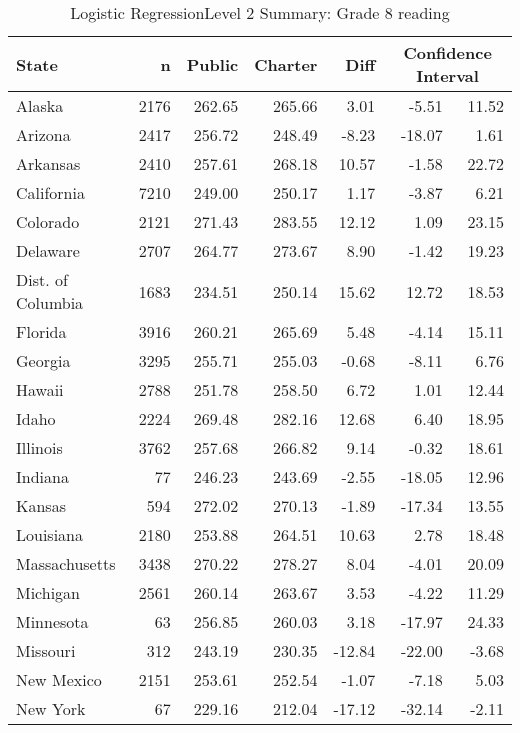 \begin{table}[ht]
\begin{center}
\caption{Logistic RegressionLevel 2 Summary: Grade 8 reading}
\label{g8readinglrlevel2}
\begin{tabular}{lrrrrrr}
  \hline
  State & n & Public & Charter & Diff & \multicolumn{2}{c}{Confidence Interval} \\ \hline
Alaska & 2176 & 262.65 & 265.66 & 3.01 & -5.51 & 11.52 \\ 
  Arizona & 2417 & 256.72 & 248.49 & -8.23 & -18.07 & 1.61 \\ 
  Arkansas & 2410 & 257.61 & 268.18 & 10.57 & -1.58 & 22.72 \\ 
  California & 7210 & 249.00 & 250.17 & 1.17 & -3.87 & 6.21 \\ 
  Colorado & 2121 & 271.43 & 283.55 & 12.12 & 1.09 & 23.15 \\ 
  Delaware & 2707 & 264.77 & 273.67 & 8.90 & -1.42 & 19.23 \\ 
  Dist. of Columbia & 1683 & 234.51 & 250.14 & 15.62 & 12.72 & 18.53 \\ 
  Florida & 3916 & 260.21 & 265.69 & 5.48 & -4.14 & 15.11 \\ 
  Georgia & 3295 & 255.71 & 255.03 & -0.68 & -8.11 & 6.76 \\ 
  Hawaii & 2788 & 251.78 & 258.50 & 6.72 & 1.01 & 12.44 \\ 
  Idaho & 2224 & 269.48 & 282.16 & 12.68 & 6.40 & 18.95 \\ 
  Illinois & 3762 & 257.68 & 266.82 & 9.14 & -0.32 & 18.61 \\ 
  Indiana &  77 & 246.23 & 243.69 & -2.55 & -18.05 & 12.96 \\ 
  Kansas & 594 & 272.02 & 270.13 & -1.89 & -17.34 & 13.55 \\ 
  Louisiana & 2180 & 253.88 & 264.51 & 10.63 & 2.78 & 18.48 \\ 
  Massachusetts & 3438 & 270.22 & 278.27 & 8.04 & -4.01 & 20.09 \\ 
  Michigan & 2561 & 260.14 & 263.67 & 3.53 & -4.22 & 11.29 \\ 
  Minnesota &  63 & 256.85 & 260.03 & 3.18 & -17.97 & 24.33 \\ 
  Missouri & 312 & 243.19 & 230.35 & -12.84 & -22.00 & -3.68 \\ 
  New Mexico & 2151 & 253.61 & 252.54 & -1.07 & -7.18 & 5.03 \\ 
  New York &  67 & 229.16 & 212.04 & -17.12 & -32.14 & -2.11 \\ 

\end{tabular}
\end{center}
\end{table}

